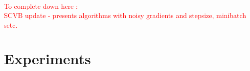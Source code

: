 ~\\
\textcolor{red}{To complete down here  : ~\\
SCVB update - presents algorithms with noisy gradients and stepsize, minibatch setc.
}



\section{Experiments}

%
